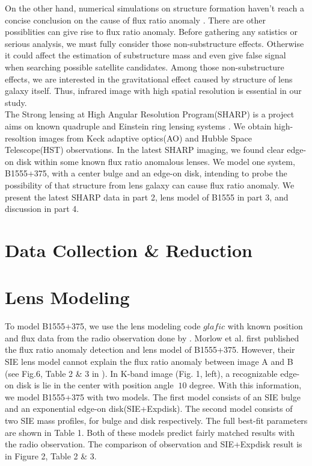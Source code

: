 \documentclass[manuscript]{emulateapj}
\begin{document}
	On the other hand, numerical simulations on structure formation haven't reach a concise conclusion on the cause of flux ratio anomaly \citep{Xu14}. There are other possiblities can give rise to flux ratio anomaly. Before gathering any satistics or serious analysis, we must fully consider those non-substructure effects. Otherwise it could affect the estimation of substructure mass and even give false signal when searching possible satellite candidates. Among those non-substructure effects, we are interested in the gravitational effect caused by structure of lens galaxy itself. Thus, infrared image with high spatial resolution is essential in our study.\\
	The Strong lensing at High Angular Resolution Program(SHARP) is a project aims on known quadruple and Einstein ring lensing systems \citep{SHARP12}. We obtain high-resoltion images from Keck adaptive optics(AO) and Hubble Space Telescope(HST) observations. In the latest SHARP imaging, we found clear edge-on disk within some known flux ratio anomalous lenses. We model one system, B1555+375, with a center bulge and an edge-on disk, intending to probe the possibility of that structure from lens galaxy can cause flux ratio anomaly. We present the latest SHARP data in part 2, lens model of B1555 in part 3, and discussion in part 4. 

\section{Data Collection \& Reduction}

\section{Lens Modeling}
To model B1555+375, we use the lens modeling code $glafic$ \citep{Oguri} with known position and flux data from the radio observation done by \citet{Marlow}. Morlow et al. first published the flux ratio anomaly detection and lens model of B1555+375. However, their SIE lens model cannot explain the flux ratio anomaly between image A and B (see Fig.6, Table 2 \& 3 in \citet{Marlow}). In K-band image (Fig. 1, left), a recognizable edge-on disk is lie in the center with position angle $~10$ degree. With this information, we model B1555+375 with two models. The first model consists of an SIE bulge and an exponential edge-on disk(SIE+Expdisk). The second model consists of two SIE mass profiles, for bulge and disk respectively. The full best-fit parameters are shown in Table 1. Both of these models predict fairly matched results with the radio observation. The comparison of observation and SIE+Expdisk result is in Figure 2, Table 2 \& 3.\\
\end{document}
